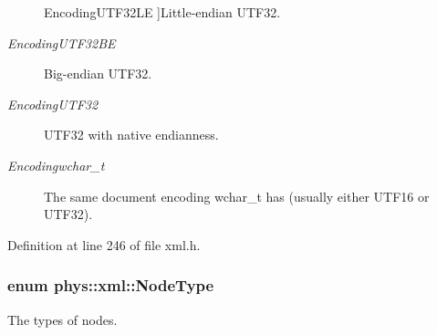 \begin{Desc}
\begin{description}
{{EncodingUTF32LE}
\label{d9/d27/namespacephys_1_1xml_a420f5de782438f88160321385bea2015a127752883aaf8c9bdb5f66ec725211fc}
}]Little-\/endian UTF32. \item[{\em 
\hypertarget{namespacephys_1_1xml_a420f5de782438f88160321385bea2015a5fb13deaf1552b0f4c00e2b8cafce0b9}{
EncodingUTF32BE}
\label{d9/d27/namespacephys_1_1xml_a420f5de782438f88160321385bea2015a5fb13deaf1552b0f4c00e2b8cafce0b9}
}]Big-\/endian UTF32. \item[{\em 
\hypertarget{namespacephys_1_1xml_a420f5de782438f88160321385bea2015ac61c2f632bd66c2466c29783beb33f8a}{
EncodingUTF32}
\label{d9/d27/namespacephys_1_1xml_a420f5de782438f88160321385bea2015ac61c2f632bd66c2466c29783beb33f8a}
}]UTF32 with native endianness. \item[{\em 
\hypertarget{namespacephys_1_1xml_a420f5de782438f88160321385bea2015a2bc9c8d42796901c8feaa25e17c56cef}{
Encodingwchar\_\-t}
\label{d9/d27/namespacephys_1_1xml_a420f5de782438f88160321385bea2015a2bc9c8d42796901c8feaa25e17c56cef}
}]The same document encoding wchar\_\-t has (usually either UTF16 or UTF32). \end{description}
\end{Desc}



Definition at line 246 of file xml.h.

\hypertarget{namespacephys_1_1xml_a668b0cc666a9d49f7c7222a7552115d3}{
\subsubsection[{NodeType}]{\setlength{\rightskip}{0pt plus 5cm}enum {\bf phys::xml::NodeType}}}
\label{d9/d27/namespacephys_1_1xml_a668b0cc666a9d49f7c7222a7552115d3}


The types of nodes. 

